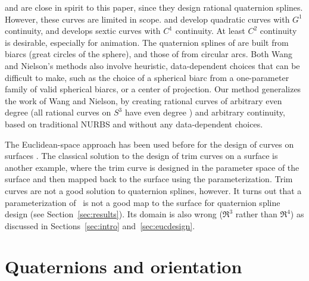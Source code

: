 \cite{wang93, wang94} and \cite{nielson93} are close in spirit 
to this paper, since they design rational quaternion splines.
However, these curves are limited in scope.
\cite{wang93,wang94} and \cite{nielson93} develop quadratic curves
with $G^1$ continuity, and \cite{wang94} develops sextic curves
with $C^1$ continuity.
At least $C^2$ continuity is desirable, especially for animation.
The quaternion splines of \cite{wang93} are built from biarcs 
(great circles of the sphere), and those of \cite{nielson93} from circular arcs.
Both Wang and Nielson's methods also involve heuristic, data-dependent choices
that can be difficult to make,
such as the choice of a spherical biarc from
a one-parameter family of valid spherical biarcs, or a center of projection.
Our method generalizes the work of Wang and Nielson, 
by creating rational curves of arbitrary even degree 
(all rational curves on $S^3$ have even degree \cite{wang94}) 
and arbitrary continuity,
based on traditional NURBS and without any data-dependent choices.

The Euclidean-space approach has been used before
for the design of curves on surfaces \cite{dietz93,wang94}.
The classical solution to the design of trim curves on a surface 
is another example, where the trim curve is designed in the parameter space 
of the surface and then mapped back to the surface using the
parameterization. %
Trim curves are not a good solution to quaternion splines, however.
It turns out that a parameterization of \ is not a good map
to the surface for quaternion spline design (see Section~\ref{sec:results}).
Its domain is also wrong ($\Re^3$ rather than $\Re^4$) as discussed
in Sections~\ref{sec:intro} and~\ref{sec:eucdesign}.

\section{Quaternions and orientation}
\label{sec:quaternion}

